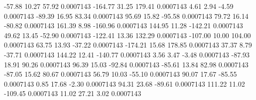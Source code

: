       -57.88       10.27       57.92     0.0007143
     -164.77       31.25      179.41     0.0007143
        4.61        2.94       -4.59     0.0007143
      -89.39       16.95       83.34     0.0007143
       95.69       15.82      -95.58     0.0007143
       79.72       16.14      -80.82     0.0007143
      161.39        8.98     -160.96     0.0007143
      144.95       11.28     -142.21     0.0007143
       49.62       13.45      -52.90     0.0007143
     -122.41       13.36      132.29     0.0007143
     -107.00       10.00      104.00     0.0007143
       63.75       13.93      -37.22     0.0007143
     -174.21       15.68      178.85     0.0007143
       37.37        8.79      -37.71     0.0007143
      144.22       12.41     -140.77     0.0007143
        3.56        3.47       -3.48     0.0007143
      -87.93       18.91       90.26     0.0007143
       96.39       15.03      -92.84     0.0007143
      -85.61       13.84       82.98     0.0007143
      -87.05       15.62       80.67     0.0007143
       56.79       10.03      -55.10     0.0007143
       90.07       17.67      -85.55     0.0007143
        0.85       17.68       -2.30     0.0007143
       94.31       23.68      -89.61     0.0007143
      111.22       11.02     -109.45     0.0007143
       11.02       27.21        3.02     0.0007143

